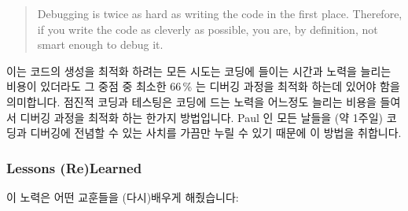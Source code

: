{	\begin{quote}
		Debugging is twice as hard as writing the code in the first
		place. Therefore, if you write the code as cleverly as possible,
		you are, by definition, not smart enough to debug it.
	\end{quote}

	이는 코드의 생성을 최적화 하려는 모든 시도는 코딩에 들이는 시간과
	노력을 늘리는 비용이 있더라도 그 중점 중 최소한 66\,\% 는 디버깅 과정을
	최적화 하는데 있어야 함을 의미합니다.
	점진적 코딩과 테스팅은 코딩에 드는 노력을 어느정도 늘리는 비용을 들여서
	디버깅 과정을 최적화 하는 한가지 방법입니다.
	Paul 인 모든 날들을 (약 1주일) 코딩과 디버깅에 전념할 수 있는 사치를
	가끔만 누릴 수 있기 때문에 이 방법을 취합니다.

	\iffalse

	This means that any attempt to optimize the production of code should
	place at least 66\,\% of its emphasis on optimizing the debugging process,
	even at the expense of increasing the time and effort spent coding.
	Incremental coding and testing is one way to optimize the debugging
	process, at the expense of some increase in coding effort.
	Paul uses this approach because he rarely has the luxury of
	devoting full days (let alone weeks) to coding and debugging.

	\fi

}\QuickQuizEnd

\subsubsection{Lessons (Re)Learned}
\label{sec:formal:Lessons (Re)Learned}

이 노력은 어떤 교훈들을 (다시)배우게 해줬습니다:

\iffalse

This effort provided some lessons (re)learned:

\fi

